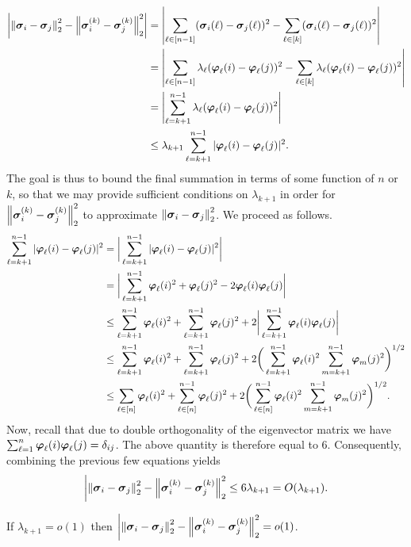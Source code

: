 \begin{align*}
\bigg| \norm{\vb*{\sigma}_i-\vb*{\sigma}_j}_2^2 - \norm{\vb*{\sigma}_i^{(k)}-\vb*{\sigma}_j^{(k)}}_2^2  \bigg| &= \left| \sum_{\ell\in[n-1]} (\vb*{\sigma}_i(\ell)-\vb*{\sigma}_j(\ell))^2  - \sum_{\ell\in[k]}(\vb*{\sigma}_i(\ell) - \vb*{\sigma}_j(\ell))^2 \right|\\ 
&= \left| \sum_{\ell\in[n-1]} \lambda_\ell(\vb*{\varphi}_\ell(i)-\vb*{\varphi}_\ell(j))^2  - \sum_{\ell\in[k]}\lambda_\ell(\vb*{\varphi}_\ell(i) - \vb*{\varphi}_\ell(j))^2 \right|\\ 
&=\left| \sum_{\ell=k+1}^{n-1} \lambda_\ell(\vb*{\varphi}_\ell(i)-\vb*{\varphi}_\ell(j))^2 \right|\\ 
&\leq \lambda_{k+1} \sum_{\ell=k+1}^{n-1} |\vb*{\varphi}_\ell(i)-\vb*{\varphi}_\ell(j)|^2.
\end{align*}
The  goal is  thus to bound the final summation in  terms of some function of $n$ or $k$, so that we may provide sufficient conditions on $\lambda_{k+1}$ in order for $\norm{\vb*{\sigma}_i^{(k)}-\vb*{\sigma}_j^{(k)}}_2^2$ to approximate $\norm{\vb*{\sigma}_i-\vb*{\sigma}_j}_2^2$. We proceed as follows. 
\begin{align*}
\sum_{\ell=k+1}^{n-1} |\vb*{\varphi}_\ell(i)-\vb*{\varphi}_\ell(j)|^2 &= \bigg|\sum_{\ell=k+1}^{n-1} |\vb*{\varphi}_\ell(i)-\vb*{\varphi}_\ell(j)|^2\bigg| \\
&= \bigg|\sum_{\ell={k+1}}^{n-1} \vb*{\varphi}_\ell(i)^2 + \vb*{\varphi}_\ell(j)^2 - 2\vb*{\varphi}_\ell(i)\vb*{\varphi}_\ell(j) \bigg|\\
&\leq \sum_{\ell=k+1}^{n-1} \vb*{\varphi}_\ell(i)^2 + \sum_{\ell=k+1}^{n-1} \vb*{\varphi}_\ell(j)^2 + 2\bigg|\sum_{\ell=k+1}^{n-1} \vb*{\varphi}_\ell(i)\vb*{\varphi}_\ell(j)\bigg| \\
&\leq \sum_{\ell=k+1}^{n-1} \vb*{\varphi}_\ell(i)^2 + \sum_{\ell=k+1}^{n-1} \vb*{\varphi}_\ell(j)^2 + 2\bigg(\sum_{\ell=k+1}^{n-1}\vb*{\varphi}_\ell(i)^2\sum_{m=k+1}^{n-1}\vb*{\varphi}_m(j)^2\bigg) ^{1/2} \\
&\leq \sum_{\ell\in[n]} \vb*{\varphi}_\ell(i)^2 + \sum_{\ell\in[n]}^{n-1} \vb*{\varphi}_\ell(j)^2 + 2\bigg(\sum_{\ell\in[n]}^{n-1}\vb*{\varphi}_\ell(i)^2\sum_{m=k+1}^{n-1}\vb*{\varphi}_m(j)^2\bigg) ^{1/2}. 
\end{align*} 
Now,  recall that due to double orthogonality of the eigenvector matrix we  have $\sum_{\ell=1}^n \vb*{\varphi}_\ell(i)\vb*{\varphi}_\ell(j) = \delta_{ij}$.  The above quantity is therefore  equal to 6. Consequently, combining the previous few equations yields 
\begin{equation*}
\bigg| \norm{\vb*{\sigma}_i-\vb*{\sigma}_j}_2^2 - \norm{\vb*{\sigma}_i^{(k)}-\vb*{\sigma}_j^{(k)}}_2^2\leq 6\lambda_{k+1}=O(\lambda_{k+1}). 
\end{equation*}

\begin{lemma}
	If $\lambda_{k+1}=o(1)$ then $\bigg| \norm{\vb*{\sigma}_i-\vb*{\sigma}_j}_2^2 - \norm{\vb*{\sigma}_i^{(k)}-\vb*{\sigma}_j^{(k)}}_2^2= o(1)$. 
\end{lemma}

